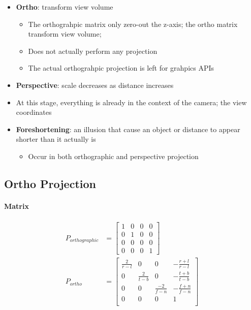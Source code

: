   \begin{itemize}
    \item \textbf{Ortho}: transform view volume
    \begin{itemize}
      \item The orthograhpic matrix only zero-out the z-axis; the ortho matrix
      transform view volume;
      \item Does not actually perform any projection
      \item The actual orthograhpic projection is left for grahpics APIs
    \end{itemize}

    \item \textbf{Perspective}: scale decreases as distance increases
    \item At this stage, everything is already in the context of the camera;
    the view coordinates
    \item \textbf{Foreshortening}: an illusion that cause an object or distance
    to appear shorter than it actually is
    \begin{itemize}
      \item Occur in both orthographic and perspective projection
    \end{itemize}
  \end{itemize}

  \subsection{Ortho Projection}

    \paragraph{Matrix}
    \begin{align}
      P_{orthographic} &=
      \begin{bmatrix}
        1 & 0 & 0 & 0 \\
        0 & 1 & 0 & 0 \\
        0 & 0 & 0 & 0 \\
        0 & 0 & 0 & 1
      \end{bmatrix} \\
      P_{ortho} &=
      \begin{bmatrix}
        \frac{2}{r - l} & 0 & 0 & -\frac{r + l}{r - l} \\
        0 & \frac{2}{t - b} & 0 & -\frac{t + b}{t - b} \\
        0 & 0 & \frac{-2}{f - n} & -\frac{f + n}{f - n} \\
        0 & 0 & 0 & 1 \\
      \end{bmatrix}
    \end{align}

